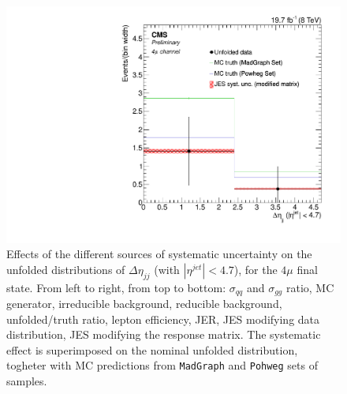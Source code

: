 \begin{figure}[hbtp]
\begin{center}
   \includegraphics[width=0.8\cmsFigWidth]{Figures/Unfolding/Systematics/ZZTo4m_Deta_JES_ModMat_Mad_fr}
   \caption{Effects of the different sources of systematic uncertainty on the unfolded distributions of $\Delta\eta_{jj}$ (with $|\eta^{jet}|<4.7$), for the $4\mu$ final state. From left to right, from top to bottom: $\sigma_{qq}$ and $\sigma_{gg}$ ratio, MC generator, irreducible background, reducible background, unfolded/truth ratio, lepton efficiency, JER, JES modifying data distribution, JES modifying the response matrix. The systematic effect is superimposed on the nominal unfolded distribution, togheter with MC predictions from \texttt{MadGraph} and \texttt{Pohweg} sets of samples.}
   \label{fig:Deta_syst_4m}
 \end{center}
\end{figure}

